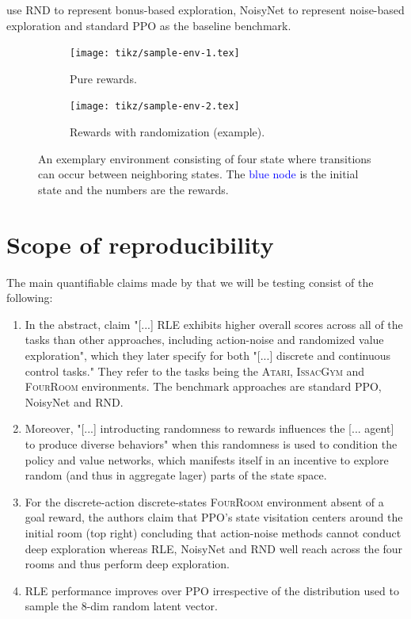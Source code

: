 \documentclass[10pt]{article} %
\begin{document}
\noindent \cite{rle-paper} use RND to represent bonus-based exploration, NoisyNet to represent noise-based exploration and standard PPO as the baseline benchmark.

\begin{figure}[h!]
  \centering
  \begin{subfigure}[b]{0.45\textwidth}
    \centering
    \texttt{[image: tikz/sample-env-1.tex]}
    \caption{Pure rewards.}
    \label{fig:sample-env-1}
  \end{subfigure}
  \hfill
  \begin{subfigure}[b]{0.45\textwidth}
    \centering
    \texttt{[image: tikz/sample-env-2.tex]}
    \caption{Rewards with randomization (example).}
    \label{fig:sample-env-2}
  \end{subfigure}
  
  \caption{An exemplary environment consisting of four state where transitions can occur between neighboring states. The \textcolor{blue}{blue node} is the initial state and the numbers are the rewards.}
  \label{fig:sample-env}
\end{figure}

\newpage
\section{Scope of reproducibility}
\label{sec:claims}

\noindent The main quantifiable claims made by \cite{rle-paper} that we will be testing consist of the following:

\begin{enumerate}
    \item In the abstract, \cite{rle-paper} claim "[...] RLE exhibits higher overall scores across all of the tasks than other approaches, including action-noise and randomized value exploration", which they later specify for both "[...] discrete and continuous control tasks." They refer to the tasks being the \textsc{Atari}, \textsc{IssacGym} and \textsc{FourRoom} environments. The benchmark approaches are standard PPO, NoisyNet and RND.
    \item Moreover, "[...] introducting randomness to rewards influences the [... agent] to produce diverse behaviors" \citep{rle-paper} when this randomness is used to condition the policy and value networks, which manifests itself in an incentive to explore random (and thus in aggregate lager) parts of the state space.
    \item For the discrete-action discrete-states \textsc{FourRoom} environment absent of a goal reward, the authors claim that PPO's state visitation centers around the initial room (top right) concluding that action-noise methods cannot conduct deep exploration whereas RLE, NoisyNet and RND well reach across the four rooms and thus perform deep exploration.
    \item RLE performance improves over PPO irrespective of the distribution used to sample the 8-dim random latent vector.
\end{enumerate}
\end{document}
